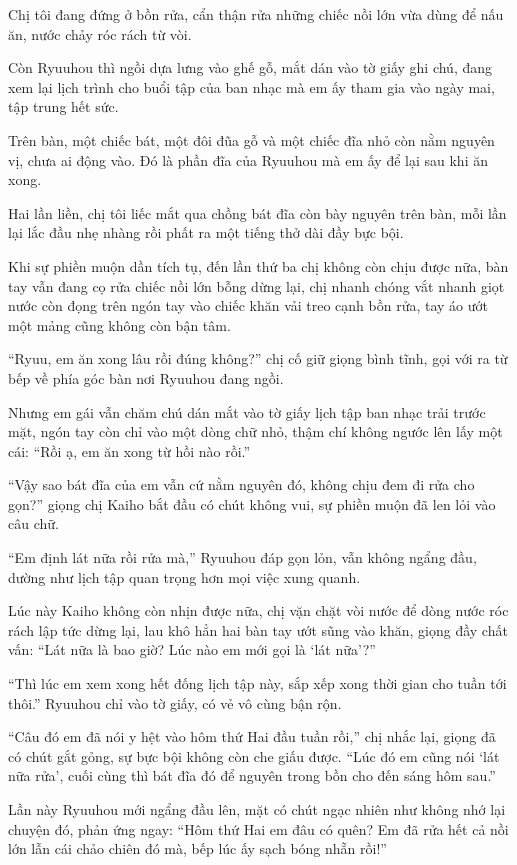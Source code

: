 \documentclass[../main.tex]{subfiles}
\begin{document}
Chị tôi đang đứng ở bồn rửa, cẩn thận rửa những chiếc nồi lớn vừa dùng để nấu ăn, nước chảy róc rách từ vòi.

Còn Ryuuhou thì ngồi dựa lưng vào ghế gỗ, mắt dán vào tờ giấy ghi chú, đang xem lại lịch trình cho buổi tập của ban nhạc mà em ấy tham gia vào ngày mai, tập trung hết sức.

Trên bàn, một chiếc bát, một đôi đũa gỗ và một chiếc đĩa nhỏ còn nằm nguyên vị, chưa ai động vào. Đó là phần đĩa của Ryuuhou mà em ấy để lại sau khi ăn xong.

Hai lần liền, chị tôi liếc mắt qua chồng bát đĩa còn bày nguyên trên bàn, mỗi lần lại lắc đầu nhẹ nhàng rồi phất ra một tiếng thở dài đầy bực bội.

Khi sự phiền muộn dần tích tụ, đến lần thứ ba chị không còn chịu được nữa, bàn tay vẫn đang cọ rửa chiếc nồi lớn bỗng dừng lại, chị nhanh chóng vắt nhanh giọt nước còn đọng trên ngón tay vào chiếc khăn vải treo cạnh bồn rửa, tay áo ướt một mảng cũng không còn bận tâm.

``Ryuu, em ăn xong lâu rồi đúng không?'' chị cố giữ giọng bình tĩnh, gọi với ra từ bếp về phía góc bàn nơi Ryuuhou đang ngồi.

Nhưng em gái vẫn chăm chú dán mắt vào tờ giấy lịch tập ban nhạc trải trước mặt, ngón tay còn chỉ vào một dòng chữ nhỏ, thậm chí không ngước lên lấy một cái: ``Rồi ạ, em ăn xong từ hồi nào rồi.''

``Vậy sao bát đĩa của em vẫn cứ nằm nguyên đó, không chịu đem đi rửa cho gọn?'' giọng chị Kaiho bắt đầu có chút không vui, sự phiền muộn đã len lỏi vào câu chữ.

``Em định lát nữa rồi rửa mà,'' Ryuuhou đáp gọn lỏn, vẫn không ngẩng đầu, dường như lịch tập quan trọng hơn mọi việc xung quanh.

Lúc này Kaiho không còn nhịn được nữa, chị vặn chặt vòi nước để dòng nước róc rách lập tức dừng lại, lau khô hẳn hai bàn tay ướt sũng vào khăn, giọng đầy chất vấn: ``Lát nữa là bao giờ? Lúc nào em mới gọi là `lát nữa'?''

``Thì lúc em xem xong hết đống lịch tập này, sắp xếp xong thời gian cho tuần tới thôi.'' Ryuuhou chỉ vào tờ giấy, có vẻ vô cùng bận rộn.

``Câu đó em đã nói y hệt vào hôm thứ Hai đầu tuần rồi,'' chị nhắc lại, giọng đã có chút gắt gỏng, sự bực bội không còn che giấu được. ``Lúc đó em cũng nói `lát nữa rửa', cuối cùng thì bát đĩa đó để nguyên trong bồn cho đến sáng hôm sau.''

Lần này Ryuuhou mới ngẩng đầu lên, mặt có chút ngạc nhiên như không nhớ lại chuyện đó, phản ứng ngay: ``Hôm thứ Hai em đâu có quên? Em đã rửa hết cả nồi lớn lẫn cái chảo chiên đó mà, bếp lúc ấy sạch bóng nhẵn rồi!''
\end{document}
